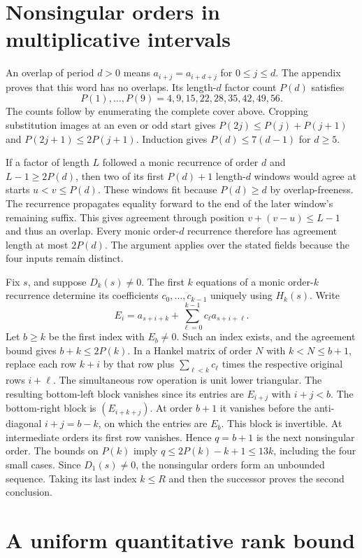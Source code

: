 \documentclass[10pt]{article}
\begin{document}
\section{Nonsingular orders in multiplicative intervals}
An overlap of period \(d>0\) means \(a_{i+j}=a_{i+d+j}\) for \(0\le j\le d\). The appendix proves that this word has no overlaps. Its length-\(d\) factor count \(P(d)\) satisfies
\[
 P(1),\ldots,P(9)=4,9,15,22,28,35,42,49,56.
\]
The counts follow by enumerating the complete cover above. Cropping substitution images at an even or odd start gives \(P(2j)\le P(j)+P(j+1)\) and \(P(2j+1)\le2P(j+1)\). Induction gives \(P(d)\le7(d-1)\) for \(d\ge5\).

If a factor of length \(L\) followed a monic recurrence of order \(d\) and \(L-1\ge2P(d)\), then two of its first \(P(d)+1\) length-\(d\) windows would agree at starts \(u<v\le P(d)\). These windows fit because \(P(d)\ge d\) by overlap-freeness. The recurrence propagates equality forward to the end of the later window's remaining suffix. This gives agreement through position \(v+(v-u)\le L-1\) and thus an overlap. Every monic order-\(d\) recurrence therefore has agreement length at most \(2P(d)\). The argument applies over the stated fields because the four inputs remain distinct.

Fix \(s\), and suppose \(D_k(s)\ne0\). The first \(k\) equations of a monic order-\(k\) recurrence determine its coefficients \(c_0,\ldots,c_{k-1}\) uniquely using \(H_k(s)\). Write
\[
 E_i=a_{s+i+k}+\sum_{\ell=0}^{k-1}c_\ell a_{s+i+\ell}.
\]
Let \(b\ge k\) be the first index with \(E_b\ne0\). Such an index exists, and the agreement bound gives \(b+k\le2P(k)\). In a Hankel matrix of order \(N\) with \(k<N\le b+1\), replace each row \(k+i\) by that row plus \(\sum_{\ell<k}c_\ell\) times the respective original rows \(i+\ell\). The simultaneous row operation is unit lower triangular. The resulting bottom-left block vanishes since its entries are \(E_{i+j}\) with \(i+j<b\). The bottom-right block is \((E_{i+k+j})\). At order \(b+1\) it vanishes before the anti-diagonal \(i+j=b-k\), on which the entries are \(E_b\). This block is invertible. At intermediate orders its first row vanishes. Hence \(q=b+1\) is the next nonsingular order. The bounds on \(P(k)\) imply \(q\le2P(k)-k+1\le13k\), including the four small cases. Since \(D_1(s)\ne0\), the nonsingular orders form an unbounded sequence. Taking its last index \(k\le R\) and then the successor proves the second conclusion.

\section{A uniform quantitative rank bound}
\end{document}
